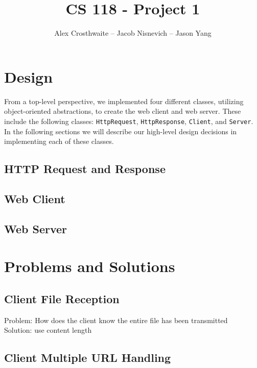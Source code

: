 \documentclass{article}
\begin{document}
\title{CS 118 - Project 1}
\author{Alex Crosthwaite -- Jacob Nisnevich -- Jason Yang}

\maketitle

\section{Design}

From a top-level perspective, we implemented four different classes, utilizing object-oriented abstractions, to create the web client and web server. These include the following classes: \texttt{HttpRequest}, \texttt{HttpResponse}, \texttt{Client}, and \texttt{Server}. In the following sections we will describe our high-level design decisions in implementing each of these classes.

\subsection{HTTP Request and Response}



\subsection{Web Client}

\subsection{Web Server}

\section{Problems and Solutions}

\subsection{Client File Reception}

Problem: How does the client know the entire file has been transmitted \\

\noindent
Solution: use content length \\

\subsection{Client Multiple URL Handling}
\end{document}
